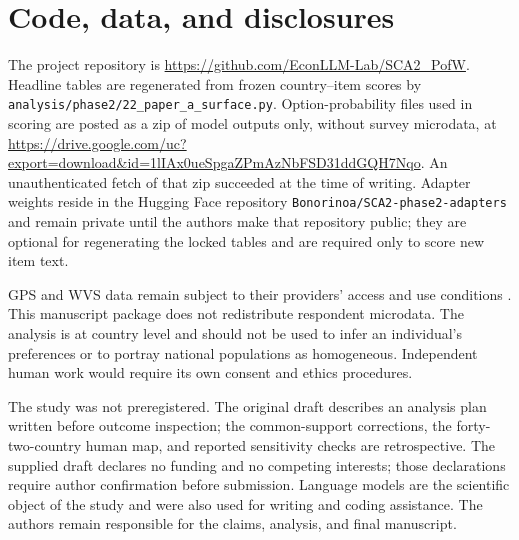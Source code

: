\section*{Code, data, and disclosures}
The project repository is \url{https://github.com/EconLLM-Lab/SCA2_PofW}. Headline tables are regenerated from frozen country--item scores by \texttt{analysis/phase2/22\_paper\_a\_surface.py}. Option-probability files used in scoring are posted as a zip of model outputs only, without survey microdata, at \url{https://drive.google.com/uc?export=download&id=1lIAx0ueSpgaZPmAzNbFSD31ddGQH7Nqo}. An unauthenticated fetch of that zip succeeded at the time of writing. Adapter weights reside in the Hugging Face repository \texttt{Bonorinoa/SCA2-phase2-adapters} and remain private until the authors make that repository public; they are optional for regenerating the locked tables and are required only to score new item text.

GPS and WVS data remain subject to their providers' access and use conditions \cite{falk2018,wvs2022}. This manuscript package does not redistribute respondent microdata. The analysis is at country level and should not be used to infer an individual's preferences or to portray national populations as homogeneous. Independent human work would require its own consent and ethics procedures.

The study was not preregistered. The original draft describes an analysis plan written before outcome inspection; the common-support corrections, the forty-two-country human map, and reported sensitivity checks are retrospective. The supplied draft declares no funding and no competing interests; those declarations require author confirmation before submission. Language models are the scientific object of the study and were also used for writing and coding assistance. The authors remain responsible for the claims, analysis, and final manuscript.
